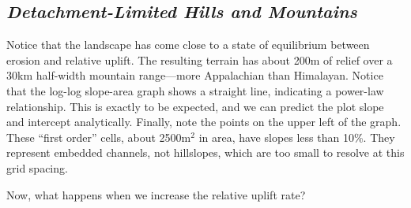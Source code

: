 \documentclass[12pt]{amsart}
\begin{document}
\subsection*{\em Detachment-Limited Hills and Mountains}

{ \em
{}
}

\noindent
Notice that the landscape has come close to a state of equilibrium between erosion and relative uplift. The resulting terrain has about 200m of relief over a 30km half-width mountain range---more Appalachian than Himalayan. Notice that the log-log slope-area graph shows a straight line, indicating a power-law relationship. This is exactly to be expected, and we can predict the plot slope and intercept analytically. Finally, note the points on the upper left of the graph. These ``first order'' cells, about 2500m$^2$ in area, have slopes less than 10\%. They represent embedded channels, not hillslopes, which are too small to resolve at this grid spacing.

Now, what happens when we increase the relative uplift rate?

{ \em
{}
}
\end{document}
